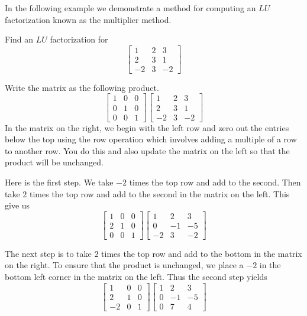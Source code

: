 \documentclass{ximera}
\begin{document}
In the following example we demonstrate a method for computing an $LU$ factorization known as the multiplier method.

\begin{example}\label{ex:multiplierLU}
Find an $LU$ factorization for
\[
\begin{bmatrix}
1 & 2 & 3 \\
2 & 3 & 1 \\
-2 & 3 & -2
\end{bmatrix} 
\]

\begin{explanation}
Write the matrix as the following product.
\[
\begin{bmatrix}
1 & 0 & 0 \\
0 & 1 & 0 \\
0 & 0 & 1
\end{bmatrix} 
\begin{bmatrix}
1 & 2 & 3 \\
2 & 3 & 1 \\
-2 & 3 & -2
\end{bmatrix} 
\]
In the matrix on the right, we begin with the left row and zero
out the entries below the top using the row operation which involves adding a multiple of a row to another row. You do this and also update the matrix on the left so that the product will be unchanged. 

Here is the first step.  We take $-2$ times the top row and add to the second. Then take $2$ times the top row and add to the second in the matrix on the left.  This give us
\[
\begin{bmatrix}
1 & 0 & 0 \\
2 & 1 & 0 \\
0 & 0 & 1
\end{bmatrix} 
\begin{bmatrix}
1 & 2 & 3 \\
0 & -1 & -5 \\
-2 & 3 & -2
\end{bmatrix} 
\]

The next step is to take $2$ times the top row and add to the bottom in the matrix on the right. To ensure that the product is unchanged, we place a $-2$ in the bottom left corner in the matrix on the left. Thus the second step yields
\[
\begin{bmatrix}
1 & 0 & 0 \\
2 & 1 & 0 \\
-2 & 0 & 1
\end{bmatrix} 
\begin{bmatrix}
1 & 2 & 3 \\
0 & -1 & -5 \\
0 & 7 & 4
\end{bmatrix} 
\]


\end{explanation}
\end{example}
\end{document}
